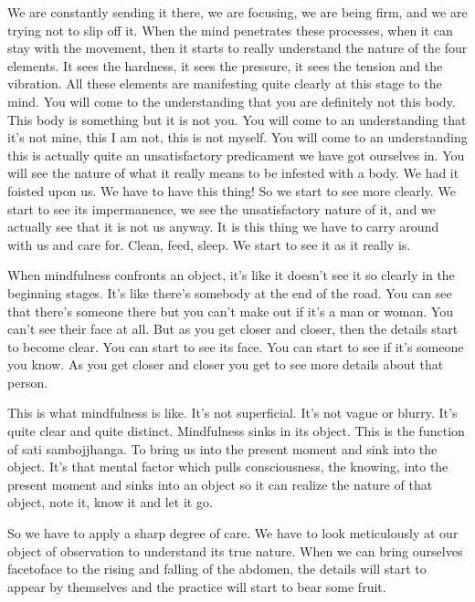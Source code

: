 \documentclass[letterpaper,10pt,english]{sphinxmanual}
\begin{document}
\sphinxAtStartPar
We are constantly sending it there, we are focusing, we are being firm,
and  we  are  trying  not  to  slip  off  it.  When  the  mind  penetrates  these  processes, when it can stay with the movement, then it starts to really understand the nature of the four elements. It sees the hardness, it sees the pressure, it sees the tension and the vibration. All these elements are manifesting
quite clearly at this stage to the mind. You will come to the understanding
that  you  are  definitely  not  this  body. This  body  is  something  but  it  is  not
you. You will come to an understanding that it’s not mine, this I am not, this
is  not  myself. You  will  come  to  an  understanding  this  is  actually  quite  an
unsatisfactory predicament we have got ourselves in. You will see the nature
of what it really means to be infested with a body. We had it foisted upon us.
We have to have this thing! So we start to see more clearly. We start to see
its impermanence, we see the unsatisfactory nature of it, and we actually see
that it is not us anyway. It is this thing we have to carry around with us and
care for. Clean, feed, sleep. We start to see it as it really is.

\sphinxAtStartPar
{}  When  mindfulness  confronts  an  object,  it’s  like  it  doesn’t  see  it  so
clearly in the beginning stages. It’s like there’s somebody at the end of the
road. You can see that there’s someone there but you can’t make out if it’s
a man or woman. You can’t see their face at all. But as you get closer and
closer, then the details start to become clear. You can start to see its face. You
can start to see if it’s someone you know. As you get closer and closer you
get to see more details about that person.

\sphinxAtStartPar
This is what mindfulness is like. It’s not superficial. It’s not vague or
blurry. It’s quite clear and quite distinct. Mindfulness sinks in its object. This
is the function of sati sambojjhanga. To bring us into the present moment
and sink into the object. It’s that mental factor which pulls consciousness, the
knowing, into the present moment and sinks into an object so it can realize
the nature of that object, note it, know it and let it go.

\sphinxAtStartPar
So we have to apply a sharp degree of care. We have to look meticulously at our object of observation to understand its true nature. When we
can bring ourselves face\sphinxhyphen{}to\sphinxhyphen{}face to the rising and falling of the abdomen, the
details will start to appear by themselves and the practice will start to bear
some fruit.
\end{document}
